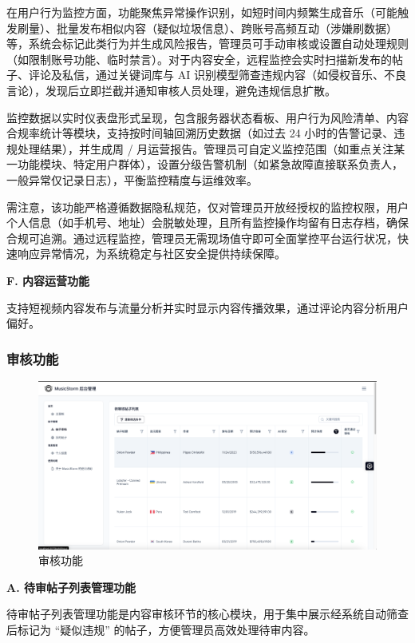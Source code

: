 \documentclass{base}
\numberwithin{figure}{section} %
\begin{document}
在用户行为监控方面，功能聚焦异常操作识别，如短时间内频繁生成音乐（可能触发刷量）、批量发布相似内容（疑似垃圾信息）、跨账号高频互动（涉嫌刷数据）等，系统会标记此类行为并生成风险报告，管理员可手动审核或设置自动处理规则（如限制账号功能、临时禁言）。对于内容安全，远程监控会实时扫描新发布的帖子、评论及私信，通过关键词库与 AI 识别模型筛查违规内容（如侵权音乐、不良言论），发现后立即拦截并通知审核人员处理，避免违规信息扩散。​

监控数据以实时仪表盘形式呈现，包含服务器状态看板、用户行为风险清单、内容合规率统计等模块，支持按时间轴回溯历史数据（如过去 24 小时的告警记录、违规处理结果），并生成周 / 月运营报告。管理员可自定义监控范围（如重点关注某一功能模块、特定用户群体），设置分级告警机制（如紧急故障直接联系负责人，一般异常仅记录日志），平衡监控精度与运维效率。​

需注意，该功能严格遵循数据隐私规范，仅对管理员开放经授权的监控权限，用户个人信息（如手机号、地址）会脱敏处理，且所有监控操作均留有日志存档，确保合规可追溯。通过远程监控，管理员无需现场值守即可全面掌控平台运行状况，快速响应异常情况，为系统稳定与社区安全提供持续保障。

\textbf{F. 内容运营功能}

支持短视频内容发布与流量分析并实时显示内容传播效果，通过评论内容分析用户偏好。

\newpage

\subsubsection{审核功能}

\begin{figure}[H]
    \centering
    \includegraphics[width=\textwidth]{images/7-3.png}
    \caption{审核功能}
    \label{fig:review}
\end{figure}

\textbf{A. 待审帖子列表管理功能}

待审帖子列表管理功能是内容审核环节的核心模块，用于集中展示经系统自动筛查后标记为 “疑似违规” 的帖子，方便管理员高效处理待审内容。
\end{document}
